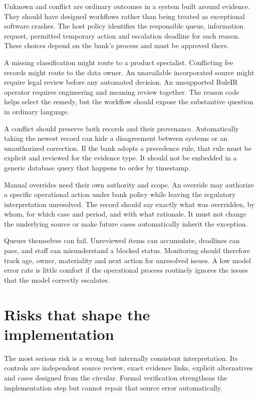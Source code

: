 \documentclass[12pt,a4paper,oneside,openany]{book}
\begin{document}
Unknown and conflict are ordinary outcomes in a system built around evidence.
They should have designed workflows rather than being treated as exceptional
software crashes. The host policy identifies the responsible queue, information
request, permitted temporary action and escalation deadline for each reason.
These choices depend on the bank's process and must be approved there.

A missing classification might route to a product specialist. Conflicting fee
records might route to the data owner. An unavailable incorporated source might
require legal review before any automated decision. An unsupported RuleIR operator
requires engineering and meaning review together. The reason code helps select
the remedy, but the workflow should expose the substantive question in ordinary
language.

A conflict should preserve both records and their provenance. Automatically taking
the newest record can hide a disagreement between systems or an unauthorized
correction. If the bank adopts a precedence rule, that rule must be explicit and
reviewed for the evidence type. It should not be embedded in a generic database
query that happens to order by timestamp.

Manual overrides need their own authority and scope. An override may authorize a
specific operational action under bank policy while leaving the regulatory
interpretation unresolved. The record should say exactly what was overridden,
by whom, for which case and period, and with what rationale. It must not change
the underlying source or make future cases automatically inherit the exception.

Queues themselves can fail. Unreviewed items can accumulate, deadlines can pass,
and staff can misunderstand a blocked status. Monitoring should therefore track
age, owner, materiality and next action for unresolved issues. A low model error
rate is little comfort if the operational process routinely ignores the issues
that the model correctly escalates.

\section{Risks that shape the implementation}
\label{merge:P-04-prototype:07}


The most serious risk is a wrong but internally consistent interpretation. Its
controls are independent source review, exact evidence links, explicit alternatives
and cases designed from the circular. Formal verification strengthens the
implementation step but cannot repair that source error automatically.
\end{document}

